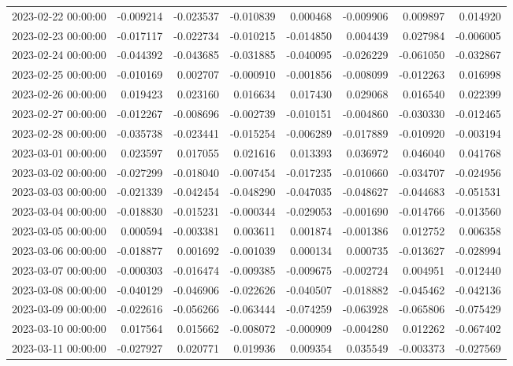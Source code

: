 \begin{tabular}{lrrrrrrr}
2023-02-22 00:00:00 & -0.009214 & -0.023537 & -0.010839 & 0.000468 & -0.009906 & 0.009897 & 0.014920 \\
2023-02-23 00:00:00 & -0.017117 & -0.022734 & -0.010215 & -0.014850 & 0.004439 & 0.027984 & -0.006005 \\
2023-02-24 00:00:00 & -0.044392 & -0.043685 & -0.031885 & -0.040095 & -0.026229 & -0.061050 & -0.032867 \\
2023-02-25 00:00:00 & -0.010169 & 0.002707 & -0.000910 & -0.001856 & -0.008099 & -0.012263 & 0.016998 \\
2023-02-26 00:00:00 & 0.019423 & 0.023160 & 0.016634 & 0.017430 & 0.029068 & 0.016540 & 0.022399 \\
2023-02-27 00:00:00 & -0.012267 & -0.008696 & -0.002739 & -0.010151 & -0.004860 & -0.030330 & -0.012465 \\
2023-02-28 00:00:00 & -0.035738 & -0.023441 & -0.015254 & -0.006289 & -0.017889 & -0.010920 & -0.003194 \\
2023-03-01 00:00:00 & 0.023597 & 0.017055 & 0.021616 & 0.013393 & 0.036972 & 0.046040 & 0.041768 \\
2023-03-02 00:00:00 & -0.027299 & -0.018040 & -0.007454 & -0.017235 & -0.010660 & -0.034707 & -0.024956 \\
2023-03-03 00:00:00 & -0.021339 & -0.042454 & -0.048290 & -0.047035 & -0.048627 & -0.044683 & -0.051531 \\
2023-03-04 00:00:00 & -0.018830 & -0.015231 & -0.000344 & -0.029053 & -0.001690 & -0.014766 & -0.013560 \\
2023-03-05 00:00:00 & 0.000594 & -0.003381 & 0.003611 & 0.001874 & -0.001386 & 0.012752 & 0.006358 \\
2023-03-06 00:00:00 & -0.018877 & 0.001692 & -0.001039 & 0.000134 & 0.000735 & -0.013627 & -0.028994 \\
2023-03-07 00:00:00 & -0.000303 & -0.016474 & -0.009385 & -0.009675 & -0.002724 & 0.004951 & -0.012440 \\
2023-03-08 00:00:00 & -0.040129 & -0.046906 & -0.022626 & -0.040507 & -0.018882 & -0.045462 & -0.042136 \\
2023-03-09 00:00:00 & -0.022616 & -0.056266 & -0.063444 & -0.074259 & -0.063928 & -0.065806 & -0.075429 \\
2023-03-10 00:00:00 & 0.017564 & 0.015662 & -0.008072 & -0.000909 & -0.004280 & 0.012262 & -0.067402 \\
2023-03-11 00:00:00 & -0.027927 & 0.020771 & 0.019936 & 0.009354 & 0.035549 & -0.003373 & -0.027569 \\

\end{tabular}
